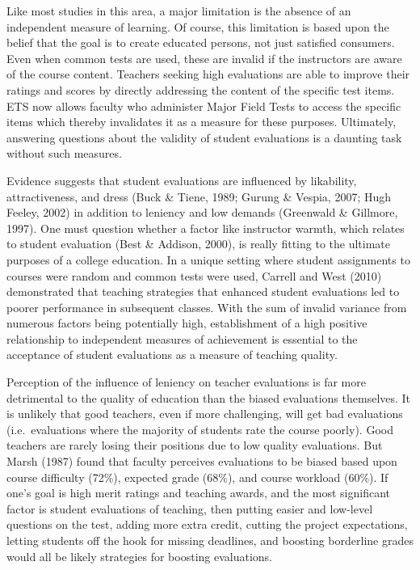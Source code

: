 \documentclass[man]{apa6}
\theoremstyle{definition}
\theoremstyle{definition}
\theoremstyle{definition}
\theoremstyle{remark}
\begin{document}
Like most studies in this area, a major limitation is the absence of an
independent measure of learning. Of course, this limitation is based
upon the belief that the goal is to create educated persons, not just
satisfied consumers. Even when common tests are used, these are invalid
if the instructors are aware of the course content. Teachers seeking
high evaluations are able to improve their ratings and scores by
directly addressing the content of the specific test items. ETS now
allows faculty who administer Major Field Tests to access the specific
items which thereby invalidates it as a measure for these purposes.
Ultimately, answering questions about the validity of student
evaluations is a daunting task without such measures.

Evidence suggests that student evaluations are influenced by likability,
attractiveness, and dress (Buck \& Tiene, 1989; Gurung \& Vespia, 2007;
Hugh Feeley, 2002) in addition to leniency and low demands (Greenwald \&
Gillmore, 1997). One must question whether a factor like instructor
warmth, which relates to student evaluation (Best \& Addison, 2000), is
really fitting to the ultimate purposes of a college education. In a
unique setting where student assignments to courses were random and
common tests were used, Carrell and West (2010) demonstrated that
teaching strategies that enhanced student evaluations led to poorer
performance in subsequent classes. With the sum of invalid variance from
numerous factors being potentially high, establishment of a high
positive relationship to independent measures of achievement is
essential to the acceptance of student evaluations as a measure of
teaching quality.

Perception of the influence of leniency on teacher evaluations is far
more detrimental to the quality of education than the biased evaluations
themselves. It is unlikely that good teachers, even if more challenging,
will get bad evaluations (i.e.~evaluations where the majority of
students rate the course poorly). Good teachers are rarely losing their
positions due to low quality evaluations. But Marsh (1987) found that
faculty perceives evaluations to be biased based upon course difficulty
(72\%), expected grade (68\%), and course workload (60\%). If one's goal
is high merit ratings and teaching awards, and the most significant
factor is student evaluations of teaching, then putting easier and
low-level questions on the test, adding more extra credit, cutting the
project expectations, letting students off the hook for missing
deadlines, and boosting borderline grades would all be likely strategies
for boosting evaluations.
\end{document}
